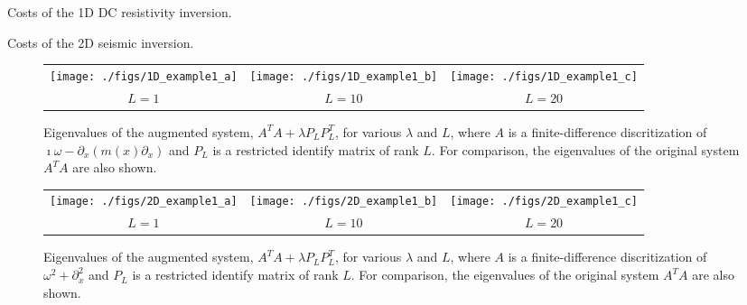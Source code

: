 \documentclass{iopart}
\begin{document}
\begin{table}
\centering

\caption{Costs of the 1D DC resistivity inversion.}
\label{table:1D_exp1}
\end{table}

\begin{table}
\centering

\caption{Costs of the 2D seismic inversion.}
\label{table:2D_exp1}
\end{table}

\clearpage

\begin{figure}
\centering
\begin{tabular}{ccc}
\texttt{[image: ./figs/1D\_example1\_a]}&
\texttt{[image: ./figs/1D\_example1\_b]}&
\texttt{[image: ./figs/1D\_example1\_c]}\\
{\small $L = 1$}&{\small $L = 10$}&{\small $L = 20$}\\
\end{tabular}
\caption{Eigenvalues of the augmented system,  $A^TA + \lambda P_LP_L^T$, for various $\lambda$ and $L$, where $A$ is a finite-difference discritization of $\imath\omega - \partial_x\left(m(x)\partial_x\right)$
and $P_L$ is a restricted identify matrix of rank $L$. For comparison, the eigenvalues of the original system $A^TA$ are also shown.}
\label{fig:1D_example1}
\end{figure}

\begin{figure}
\centering
\begin{tabular}{ccc}
\texttt{[image: ./figs/2D\_example1\_a]}&
\texttt{[image: ./figs/2D\_example1\_b]}&
\texttt{[image: ./figs/2D\_example1\_c]}\\
{\small $L = 1$}&{\small $L = 10$}&{\small $L = 20$}\\
\end{tabular}
\caption{Eigenvalues of the augmented system,  $A^TA + \lambda P_LP_L^T$, for various $\lambda$ and $L$, where $A$ is a finite-difference discritization of $\omega^2 + \partial_x^2$
and $P_L$ is a restricted identify matrix of rank $L$. For comparison, the eigenvalues of the original system $A^TA$ are also shown.}
\label{fig:2D_example1}
\end{figure}
\end{document}
